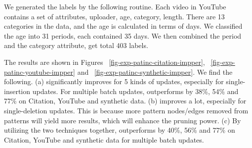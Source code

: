 We generated the labels by the following routine. Each video in YouTube contains a set of attributes, \eg uploader, age, category, length. There are 13 categories in the data, and the age is calculated in terms of days. We classified the age into 31 periods, each contained 35 days. We then combined the period and the category attribute, get total 403 labels.


%

The results are shown in Figures ~\ref{fig-exp-patinc-citation-impper}, ~\ref{fig-exp-patinc-youtube-impper} and ~\ref{fig-exp-patinc-synthetic-impper}. We find the following.
(a)  significantly improves  for 5 kinds of updates, especially for single-insertion updates. For multiple batch updates,  outperforms  by 38\%, 54\% and 77\% on Citation, YouTube and synthetic data.
(b)  improves  a lot, especially for single-deletion updates. This is because more pattern nodes/edges removed from patterns will yield more results, which will enhance the pruning power.
(c) By utilizing the two techniques together, \grouprec outperforms  by 40\%, 56\% and 77\% on Citation, YouTube and synthetic data for multiple batch updates.



